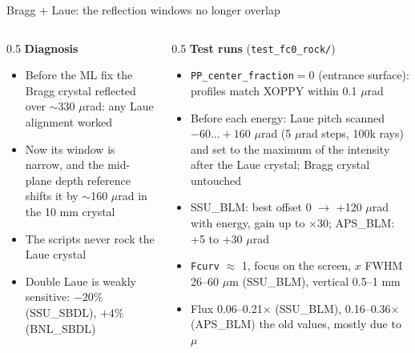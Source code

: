 \documentclass[aspectratio=169,10pt]{beamer}
\begin{document}
\begin{frame}{Bragg + Laue: the reflection windows no longer overlap}
  \small
  \begin{columns}[T]
    \begin{column}{0.5\textwidth}
      \textbf{Diagnosis}
      \begin{itemize}
        \item Before the ML fix the Bragg crystal reflected over $\sim$330 $\mu$rad:
          any Laue alignment worked
        \item Now its window is narrow, and the mid-plane depth reference shifts it by
          $\sim$160 $\mu$rad in the 10 mm crystal
        \item The scripts never rock the Laue crystal
        \item Double Laue is weakly sensitive: $-20\%$ (SSU\_SBDL), $+4\%$ (BNL\_SBDL)
      \end{itemize}
    \end{column}
    \begin{column}{0.5\textwidth}
      \textbf{Test runs} (\texttt{test\_fc0\_rock/})
      \begin{itemize}
        \item \texttt{PP\_center\_fraction}$=0$ (entrance surface): profiles match
          XOPPY within 0.1 $\mu$rad
        \item Before each energy: Laue pitch scanned $-60\ldots+160$ $\mu$rad (5 $\mu$rad
          steps, 100k rays) and set to the maximum of the intensity after the Laue crystal;
          Bragg crystal untouched
        \item SSU\_BLM: best offset 0 $\to$ +120 $\mu$rad with energy, gain up to $\times$30;
          APS\_BLM: +5 to +30 $\mu$rad
        \item \texttt{Fcurv} $\approx$ 1, focus on the screen, $x$ FWHM 26--60 $\mu$m (SSU\_BLM),
          vertical 0.5--1 mm
        \item Flux 0.06--0.21$\times$ (SSU\_BLM), 0.16--0.36$\times$ (APS\_BLM) the old values,
          mostly due to $\mu$
      \end{itemize}
    \end{column}
  \end{columns}
\end{frame}
\end{document}
